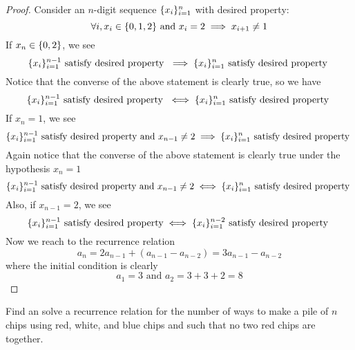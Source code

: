 \documentclass{report}
\begin{document}
\begin{proof}
Consider an $n$-digit sequence $\{ x_i \}_{i=1}^n$ with desired property:
\begin{equation*}
\forall i, x_i\in \{ 0,1,2 \}\text{ and }x_i=2\implies  x_{i+1}\neq 1 
\end{equation*}
If  $x_n\in \{ 0,2 \}$, we see 
\begin{equation*}
\{ x_i \}_{i=1}^{n-1}\text{ satisfy desired property }\implies   \{ x_i \}_{i=1}^{n}\text{ satisfy desired property }
\end{equation*}
Notice that the converse of the above statement is clearly true, so we have 
\begin{equation*}
\{ x_i \}_{i=1}^{n-1}\text{ satisfy desired property }\iff  \{ x_i \}_{i=1}^n\text{ satisfy desired property }
\end{equation*}
If $x_n=1$, we see
\begin{equation*}
\{ x_i \}_{i=1}^{n-1}\text{ satisfy desired property and $x_{n-1}\neq 2$}\implies \{ x_i \}_{i=1}^n\text{ satisfy desired property }
\end{equation*}
Again notice that the converse of the above statement is clearly true under the hypothesis $x_n=1$
 \begin{equation*}
\{ x_i \}_{i=1}^{n-1}\text{ satisfy desired property and $x_{n-1}\neq 2$}\iff  \{ x_i \}_{i=1}^n\text{ satisfy desired property }
\end{equation*}
Also, if $x_{n-1}=2$, we see 
\begin{equation*}
\{ x_i \}^{n-1}_{i=1}\text{ satisfy desired property}\iff  \{ x_i \}^{n-2}_{i=1}\text{ satisfy desired property }
\end{equation*}
Now we reach to the recurrence relation
\begin{equation*}
a_n=2a_{n-1}+(a_{n-1}-a_{n-2})=3a_{n-1}-a_{n-2}
\end{equation*}
where the initial condition is clearly 
\begin{equation*}
a_1=3\text{ and }a_2=3+3+2=8
\end{equation*}
\end{proof}
\begin{question}{}{}
Find an solve a recurrence relation for the number of ways to make a pile of $n$ chips using red, white, and blue chips and such that no two red chips are together.
\end{question}
\end{document}
